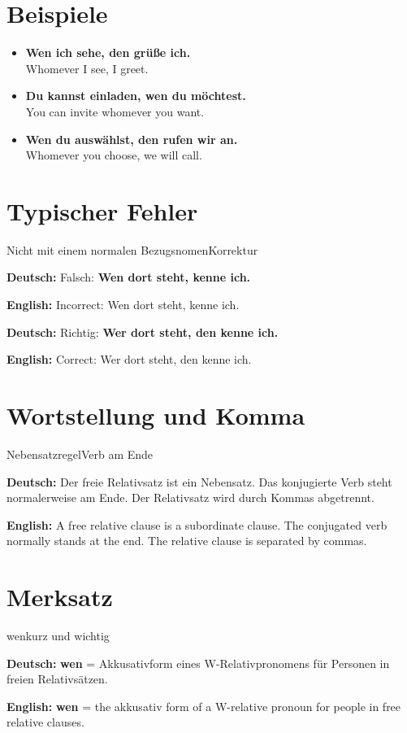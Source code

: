 \documentclass[a4paper,11pt]{article}
\newcommand{\GermanText}[1]{\textbf{Deutsch: }#1\par}
\newcommand{\EnglishText}[1]{{\small\color{SoftGray}\textbf{English: }#1\par}}
\newcommand{\ExampleItem}[2]{\item \textbf{#1}\\{\small\color{SoftGray}#2}}
\begin{document}
\section{Beispiele}

\begin{exbox}

\begin{itemize}

\ExampleItem{Wen ich sehe, den grüße ich.}{Whomever I see, I greet.}

\ExampleItem{Du kannst einladen, wen du möchtest.}{You can invite whomever you want.}

\ExampleItem{Wen du auswählst, den rufen wir an.}{Whomever you choose, we will call.}

\end{itemize}

\end{exbox}

\section{Typischer Fehler}

\begin{grammarentry}{Nicht mit einem normalen Bezugsnomen}{Korrektur}

\GermanText{Falsch: \textbf{Wen dort steht, kenne ich.}}

\EnglishText{Incorrect: Wen dort steht, kenne ich.}

\GermanText{Richtig: \textbf{Wer dort steht, den kenne ich.}}

\EnglishText{Correct: Wer dort steht, den kenne ich.}

\end{grammarentry}

\section{Wortstellung und Komma}

\begin{grammarentry}{Nebensatzregel}{Verb am Ende}

\GermanText{Der freie Relativsatz ist ein Nebensatz. Das konjugierte Verb steht normalerweise am Ende. Der Relativsatz wird durch Kommas abgetrennt.}

\EnglishText{A free relative clause is a subordinate clause. The conjugated verb normally stands at the end. The relative clause is separated by commas.}

\end{grammarentry}

\section{Merksatz}

\begin{grammarentry}{wen}{kurz und wichtig}

\GermanText{\textbf{wen} = Akkusativform eines W-Relativpronomens für Personen in freien Relativsätzen.}

\EnglishText{\textbf{wen} = the akkusativ form of a W-relative pronoun for people in free relative clauses.}

\end{grammarentry}
\end{document}

